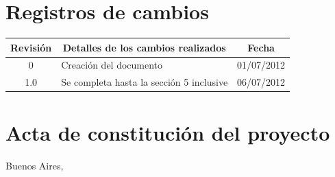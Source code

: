 \documentclass[
11pt, %
codirector, %
]{charter}
\begin{document}
\maketitle
\thispagestyle{empty}
\pagebreak


\thispagestyle{empty}
{\setlength{\parskip}{0pt}
\tableofcontents{}
}
\pagebreak


\section*{Registros de cambios}
\label{sec:registro}


\begin{table}[ht]
\label{tab:registro}
\centering
\begin{tabularx}{\linewidth}{@{}|c|X|c|@{}}
\hline
\rowcolor[HTML]{C0C0C0} 
Revisión & \multicolumn{1}{c|}{\cellcolor[HTML]{C0C0C0}Detalles de los cambios realizados} & Fecha      \\ \hline
0      & Creación del documento                                 & 01/07/2012 \\ \hline
1.0      & Se completa hasta la sección 5 inclusive                 & 06/07/2012 \\ \hline
\end{tabularx}
\end{table}

\pagebreak



\section*{Acta de constitución del proyecto}
\label{sec:acta}

\begin{flushright}
Buenos Aires, \fechaInicioName
\end{flushright}

\vspace{2cm}
\end{document}
